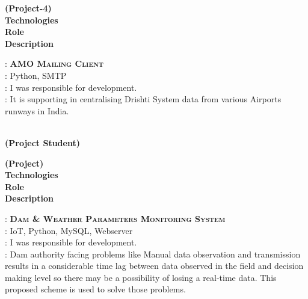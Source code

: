 \documentclass[a4paper,10pt]{memoir} %
\begin{document}

\clearpage %
\userinformation %
\framebreak %

\begin{minipage}[t]{0.20\columnwidth}
\textbf{(Project-4)}\\
\textbf{Technologies}\\
\textbf{Role}\\
\textbf{Description}\\
\end{minipage}
\begin{minipage}[t]{0.80\columnwidth}
: \textbf{\textsc{AMO Mailing Client}}\\
: Python, SMTP\\
: I was responsible for development.\\
: It is supporting in centralising Drishti System data from various Airports runways in India.
\end{minipage}


\Sep
\Sep
\begin{minipage}[t]{0.20\columnwidth}
\end{minipage}
\hfill
\begin{minipage}[t]{0.80\columnwidth}
\begin{center}
\\
\textbf{(Project Student)}
\end{center}
\end{minipage}
\Sep

\begin{minipage}[t]{0.20\columnwidth}
\textbf{(Project)}\\
\textbf{Technologies}\\
\textbf{Role}\\
\textbf{Description}
\end{minipage}
\hfill
\begin{minipage}[t]{0.80\columnwidth}
: \textbf{\textsc{Dam \& Weather Parameters Monitoring System}}\\
: IoT, Python, MySQL, Webserver\\
: I was responsible for development.\\
: Dam authority facing problems like Manual data observation and transmission results in a considerable time lag between data observed in the field and decision making level so there may be a possibility of losing a real-time data. 
This proposed scheme is used to solve those problems.
\end{minipage}
\end{document}

